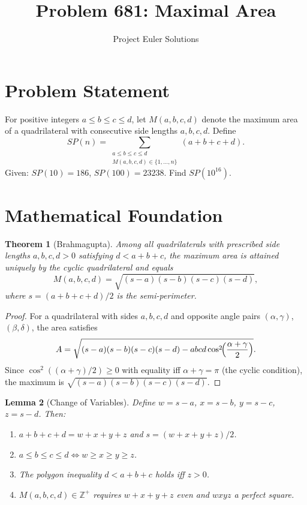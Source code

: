 \documentclass[11pt]{article}
\title{Problem 681: Maximal Area}
\author{Project Euler Solutions}
\date{}
\newtheorem{theorem}{Theorem}
\newtheorem{lemma}[theorem]{Lemma}
\begin{document}
\maketitle

\section{Problem Statement}

For positive integers $a \le b \le c \le d$, let $M(a,b,c,d)$ denote the maximum area of a quadrilateral with consecutive side lengths $a, b, c, d$. Define
\[
SP(n) = \sum_{\substack{a \le b \le c \le d \\ M(a,b,c,d) \in \{1,\ldots,n\}}} (a + b + c + d).
\]
Given: $SP(10) = 186$, $SP(100) = 23238$. Find $SP(10^{16})$.

\section{Mathematical Foundation}

\begin{theorem}[Brahmagupta]
Among all quadrilaterals with prescribed side lengths $a, b, c, d > 0$ satisfying $d < a+b+c$, the maximum area is attained uniquely by the cyclic quadrilateral and equals
\[
M(a,b,c,d) = \sqrt{(s-a)(s-b)(s-c)(s-d)},
\]
where $s = (a+b+c+d)/2$ is the semi-perimeter.
\end{theorem}

\begin{proof}
For a quadrilateral with sides $a,b,c,d$ and opposite angle pairs $(\alpha,\gamma)$, $(\beta,\delta)$, the area satisfies
\[
A = \sqrt{(s-a)(s-b)(s-c)(s-d) - abcd\cos^2\!\Bigl(\frac{\alpha+\gamma}{2}\Bigr)}.
\]
Since $\cos^2((\alpha+\gamma)/2) \ge 0$ with equality iff $\alpha+\gamma=\pi$ (the cyclic condition), the maximum is $\sqrt{(s-a)(s-b)(s-c)(s-d)}$.
\end{proof}

\begin{lemma}[Change of Variables]
Define $w = s-a$, $x = s-b$, $y = s-c$, $z = s-d$. Then:
\begin{enumerate}
  \item $a+b+c+d = w+x+y+z$ and $s = (w+x+y+z)/2$.
  \item $a \le b \le c \le d \iff w \ge x \ge y \ge z$.
  \item The polygon inequality $d < a+b+c$ holds iff $z > 0$.
  \item $M(a,b,c,d) \in \mathbb{Z}^+$ requires $w+x+y+z$ even and $wxyz$ a perfect square.
\end{enumerate}
\end{lemma}
\end{document}
